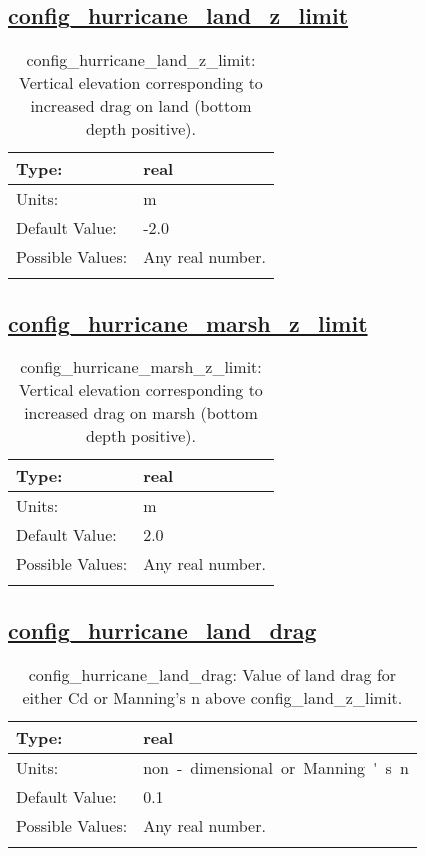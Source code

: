 \subsection[config\_hurricane\_land\_z\_limit]{\hyperref[sec:nm_tab_hurricane]{config\_hurricane\_land\_z\_limit}}
\label{subsec:nm_sec_config_hurricane_land_z_limit}
\begin{center}
\begin{longtable}{| p{2.0in} || p{4.0in} |}
    \hline
    Type: & real \\
    \hline
    Units: & \si{m} \\
    \hline
    Default Value: & -2.0 \\
    \hline
    Possible Values: & Any real number. \\
    \hline
    \caption{config\_hurricane\_land\_z\_limit: Vertical elevation corresponding to increased drag on land (bottom depth positive).}
\end{longtable}
\end{center}
\subsection[config\_hurricane\_marsh\_z\_limit]{\hyperref[sec:nm_tab_hurricane]{config\_hurricane\_marsh\_z\_limit}}
\label{subsec:nm_sec_config_hurricane_marsh_z_limit}
\begin{center}
\begin{longtable}{| p{2.0in} || p{4.0in} |}
    \hline
    Type: & real \\
    \hline
    Units: & \si{m} \\
    \hline
    Default Value: & 2.0 \\
    \hline
    Possible Values: & Any real number. \\
    \hline
    \caption{config\_hurricane\_marsh\_z\_limit: Vertical elevation corresponding to increased drag on marsh (bottom depth positive).}
\end{longtable}
\end{center}
\subsection[config\_hurricane\_land\_drag]{\hyperref[sec:nm_tab_hurricane]{config\_hurricane\_land\_drag}}
\label{subsec:nm_sec_config_hurricane_land_drag}
\begin{center}
\begin{longtable}{| p{2.0in} || p{4.0in} |}
    \hline
    Type: & real \\
    \hline
    Units: & \si{non-dimensional.or.Manning's.n} \\
    \hline
    Default Value: & 0.1 \\
    \hline
    Possible Values: & Any real number. \\
    \hline
    \caption{config\_hurricane\_land\_drag: Value of land drag for either Cd or Manning's n above config\_land\_z\_limit.}
\end{longtable}
\end{center}
